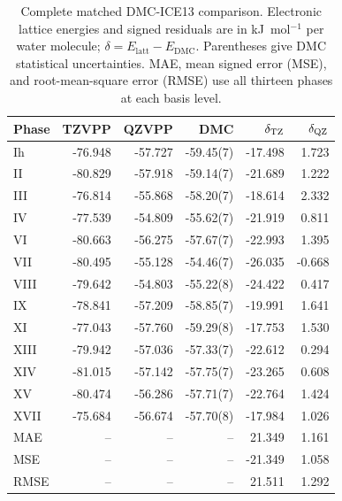 \begin{table}[htbp]
\centering\small
\caption{Complete matched DMC-ICE13 comparison. Electronic lattice energies and signed residuals are in kJ~mol$^{-1}$ per water molecule; $\delta=E_{\mathrm{latt}}-E_{\mathrm{DMC}}$. Parentheses give DMC statistical uncertainties. MAE, mean signed error (MSE), and root-mean-square error (RMSE) use all thirteen phases at each basis level.}
\label{tab:ice-basis}
\begin{tabular}{lrrrrr}
\toprule
Phase & TZVPP & QZVPP & DMC & $\delta_{\rm TZ}$ & $\delta_{\rm QZ}$\\
\midrule
Ih & -76.948 & -57.727 & -59.45(7) & -17.498 & 1.723\\
II & -80.829 & -57.918 & -59.14(7) & -21.689 & 1.222\\
III & -76.814 & -55.868 & -58.20(7) & -18.614 & 2.332\\
IV & -77.539 & -54.809 & -55.62(7) & -21.919 & 0.811\\
VI & -80.663 & -56.275 & -57.67(7) & -22.993 & 1.395\\
VII & -80.495 & -55.128 & -54.46(7) & -26.035 & -0.668\\
VIII & -79.642 & -54.803 & -55.22(8) & -24.422 & 0.417\\
IX & -78.841 & -57.209 & -58.85(7) & -19.991 & 1.641\\
XI & -77.043 & -57.760 & -59.29(8) & -17.753 & 1.530\\
XIII & -79.942 & -57.036 & -57.33(7) & -22.612 & 0.294\\
XIV & -81.015 & -57.142 & -57.75(7) & -23.265 & 0.608\\
XV & -80.474 & -56.286 & -57.71(7) & -22.764 & 1.424\\
XVII & -75.684 & -56.674 & -57.70(8) & -17.984 & 1.026\\
\midrule
MAE & -- & -- & -- & 21.349 & 1.161\\
MSE & -- & -- & -- & -21.349 & 1.058\\
RMSE & -- & -- & -- & 21.511 & 1.292\\
\bottomrule
\end{tabular}
\end{table}
